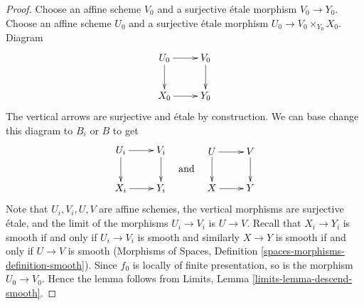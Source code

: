 \documentclass{stacks-project}
\theoremstyle{plain}
\theoremstyle{definition}
\theoremstyle{remark}
\numberwithin{equation}{subsection}
\begin{document}
\begin{proof}
Choose an affine scheme $V_0$ and a surjective \'etale morphism
$V_0 \to Y_0$. Choose an affine scheme $U_0$ and a surjective \'etale
morphism $U_0 \to V_0 \times_{Y_0} X_0$. Diagram
$$
\xymatrix{
U_0 \ar[d] \ar[r] & V_0 \ar[d] \\
X_0 \ar[r] & Y_0
}
$$
The vertical arrows are surjective and \'etale by construction.
We can base change this diagram to $B_i$ or $B$ to get
$$
\vcenter{
\xymatrix{
U_i \ar[d] \ar[r] & V_i \ar[d] \\
X_i \ar[r] & Y_i
}
}
\quad\text{and}\quad
\vcenter{
\xymatrix{
U \ar[d] \ar[r] & V \ar[d] \\
X \ar[r] & Y
}
}
$$
Note that $U_i, V_i, U, V$ are affine schemes,
the vertical morphisms are surjective \'etale, and the limit of the
morphisms $U_i \to V_i$ is $U \to V$. Recall that $X_i \to Y_i$ is smooth
if and only if $U_i \to V_i$ is smooth and similarly
$X \to Y$ is smooth if and only if $U \to V$ is smooth
(Morphisms of Spaces, Definition \ref{spaces-morphisms-definition-smooth}).
Since $f_0$ is locally of finite
presentation, so is the morphism $U_0 \to V_0$. Hence the lemma follows
from Limits, Lemma \ref{limits-lemma-descend-smooth}.
\end{proof}
\end{document}
